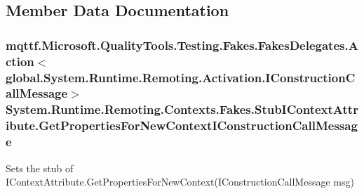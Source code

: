 \subsection{Member Data Documentation}
\hypertarget{class_system_1_1_runtime_1_1_remoting_1_1_contexts_1_1_fakes_1_1_stub_i_context_attribute_a9573614f336ab26d9d825389fdd41bbe}{
\subsubsection[{Get\-Properties\-For\-New\-Context\-I\-Construction\-Call\-Message}]{\setlength{\rightskip}{0pt plus 5cm}mqttf.\-Microsoft.\-Quality\-Tools.\-Testing.\-Fakes.\-Fakes\-Delegates.\-Action$<$global.\-System.\-Runtime.\-Remoting.\-Activation.\-I\-Construction\-Call\-Message$>$ System.\-Runtime.\-Remoting.\-Contexts.\-Fakes.\-Stub\-I\-Context\-Attribute.\-Get\-Properties\-For\-New\-Context\-I\-Construction\-Call\-Message}}\label{class_system_1_1_runtime_1_1_remoting_1_1_contexts_1_1_fakes_1_1_stub_i_context_attribute_a9573614f336ab26d9d825389fdd41bbe}


Sets the stub of I\-Context\-Attribute.\-Get\-Properties\-For\-New\-Context(\-I\-Construction\-Call\-Message msg)

